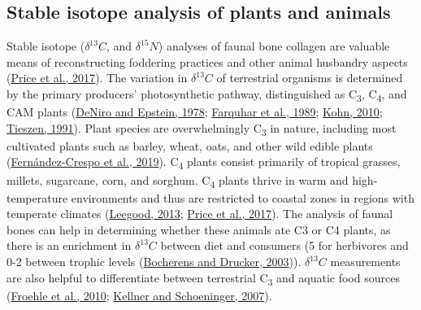 \documentclass[preprint, 3p, authoryear]{elsarticle} %
\begin{document}
\hypertarget{stable-isotope-analysis-of-plants-and-animals}{%
\subsection{Stable isotope analysis of plants and animals}\label{stable-isotope-analysis-of-plants-and-animals}}

Stable isotope (\(\delta ^{13}C\), and \(\delta ^{15}N\)) analyses of faunal bone collagen are valuable means of reconstructing foddering practices and other animal husbandry aspects (\protect\hyperlink{ref-price_etal17}{Price et al., 2017}). The variation in \(\delta ^{13}C\) of terrestrial organisms is determined by the primary producers' photosynthetic pathway, distinguished as C\textsubscript{3}, C\textsubscript{4}, and CAM plants (\protect\hyperlink{ref-deniro_epstein78}{DeNiro and Epstein, 1978}; \protect\hyperlink{ref-farquhar_etal89}{Farquhar et al., 1989}; \protect\hyperlink{ref-kohn10}{Kohn, 2010}; \protect\hyperlink{ref-tieszen91}{Tieszen, 1991}). Plant species are overwhelmingly C\textsubscript{3} in nature, including most cultivated plants such as barley, wheat, oats, and other wild edible plants (\protect\hyperlink{ref-fernandez-crespo_etal19}{Fernández-Crespo et al., 2019}). C\textsubscript{4} plants consist primarily of tropical grasses, millets, sugarcane, corn, and sorghum. C\textsubscript{4} plants thrive in warm and high-temperature environments and thus are restricted to coastal zones in regions with temperate climates (\protect\hyperlink{ref-leegood13}{Leegood, 2013}; \protect\hyperlink{ref-price_etal17}{Price et al., 2017}). The analysis of faunal bones can help in determining whether these animals ate C3 or C4 plants, as there is an enrichment in \(\delta ^{13}C\) between diet and consumers (5\text{\textperthousand} for herbivores and 0-2\text{\textperthousand} between trophic levels (\protect\hyperlink{ref-bocherens_drucker03}{Bocherens and Drucker, 2003})). \(\delta ^{13}C\) measurements are also helpful to differentiate between terrestrial C\textsubscript{3} and aquatic food sources (\protect\hyperlink{ref-froehle_etal10}{Froehle et al., 2010}; \protect\hyperlink{ref-kellner_schoeninger07}{Kellner and Schoeninger, 2007}).
\end{document}
